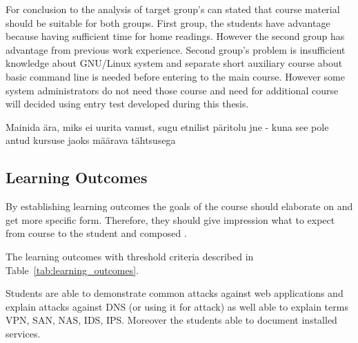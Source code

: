 For conclusion to the analysis of target group's can stated that course material should be suitable for both groups. First group, the students have advantage because having sufficient time for home readings. However the second group has advantage from previous work experience. Second group's problem is insufficient knowledge about GNU/Linux system and separate short auxiliary course about basic command line is needed before entering to the main course. However some system administrators do not need those course and need for additional course will decided using entry test developed during this thesis.

{\color{red} Mainida ära, miks ei uurita vanust, sugu etnilist päritolu jne - kuna see pole antud kursuse jaoks määrava tähtsusega }

\subsection{Learning Outcomes}

By establishing learning outcomes the goals of the course should elaborate on and get more specific form. Therefore, they should give impression what to expect from course to the student and composed  \citep[p.~7]{OppeArenduskeskus2010}.

The learning outcomes with threshold criteria described in Table~\ref{tab:learning_outcomes}.

 Students are able to demonstrate common attacks against web applications and explain attacks against \gls{DNS} (or using it for attack) as well able to explain terms \gls{VPN}, \gls{SAN}, \gls{NAS}, \gls{IDS}, \gls{IPS}. Moreover the students able to document installed services.

